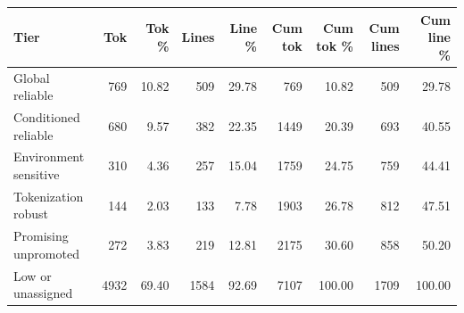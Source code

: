 \begin{tabular}{lrrrrrrrr}
\toprule
Tier & Tok & Tok \% & Lines & Line \% & Cum tok & Cum tok \% & Cum lines & Cum line \% \\
\midrule
Global reliable & 769 & 10.82 & 509 & 29.78 & 769 & 10.82 & 509 & 29.78 \\
Conditioned reliable & 680 & 9.57 & 382 & 22.35 & 1449 & 20.39 & 693 & 40.55 \\
Environment sensitive & 310 & 4.36 & 257 & 15.04 & 1759 & 24.75 & 759 & 44.41 \\
Tokenization robust & 144 & 2.03 & 133 & 7.78 & 1903 & 26.78 & 812 & 47.51 \\
Promising unpromoted & 272 & 3.83 & 219 & 12.81 & 2175 & 30.60 & 858 & 50.20 \\
Low or unassigned & 4932 & 69.40 & 1584 & 92.69 & 7107 & 100.00 & 1709 & 100.00 \\
\bottomrule
\end{tabular}
